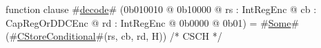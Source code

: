 function clause #\hyperref[sailMIPSzdecode]{decode}# (0b010010 @ 0b10000 @ rs : IntRegEnc @ cb : CapRegOrDDCEnc @ rd : IntRegEnc @ 0b0000 @ 0b01) = #\hyperref[sailMIPSzSome]{Some}#(#\hyperref[sailMIPSzCStoreConditional]{CStoreConditional}#(rs, cb, rd, H)) /* CSCH */
